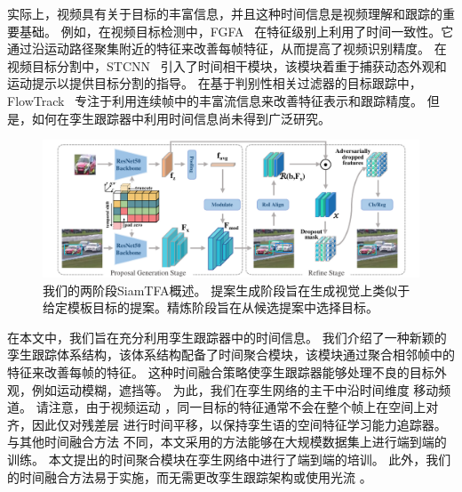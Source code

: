 实际上，视频具有关于目标的丰富信息，并且这种时间信息是视频理解和跟踪的重要基础。
例如，在视频目标检测中，FGFA~\cite{zhu2017flow} 在特征级别上利用了时间一致性。它通过沿运动路径聚集附近的特征来改善每帧特征，从而提高了视频识别精度。
在视频目标分割中，STCNN~\cite{xu2019spatiotemporal} 引入了时间相干模块，该模块着重于捕获动态外观和运动提示以提供目标分割的指导。
在基于判别性相关过滤器的目标跟踪中，FlowTrack~\cite{zhu2018end} 专注于利用连续帧中的丰富流信息来改善特征表示和跟踪精度。
但是，如何在孪生跟踪器中利用时间信息尚未得到广泛研究。

\begin{figure}[t]
    \centering
    \includegraphics[width=1.0\textwidth]{Img/end/net_v3.pdf}
    \caption{
    我们的两阶段SiamTFA概述。
    提案生成阶段旨在生成视觉上类似于给定模板目标的提案。精炼阶段旨在从候选提案中选择目标。}
    \label{fig:SiamTFA}
\end{figure}

在本文中，我们旨在充分利用孪生跟踪器中的时间信息。
我们介绍了一种新颖的孪生跟踪体系结构，该体系结构配备了时间聚合模块，该模块通过聚合相邻帧中的特征来改善每帧的特征。
这种时间融合策略使孪生跟踪器能够处理不良的目标外观，例如运动模糊，遮挡等。
为此，我们在孪生网络的主干中沿时间维度 \cite{lin2019tsm} 移动频道。
请注意，由于视频运动 \cite{zhu2017flow}，同一目标的特征通常不会在整个帧上在空间上对齐，因此仅对残差层 \cite{lin2019tsm} 进行时间平移，以保持孪生语的空间特征学习能力追踪器。
与其他时间融合方法 \cite{tao2016siamese, gladh2016deep} 不同，本文采用的方法能够在大规模数据集上进行端到端的训练。
本文提出的时间聚合模块在孪生网络中进行了端到端的培训。
此外，我们的时间融合方法易于实施，而无需更改孪生跟踪架构或使用光流 \cite{zhu2018end}。


